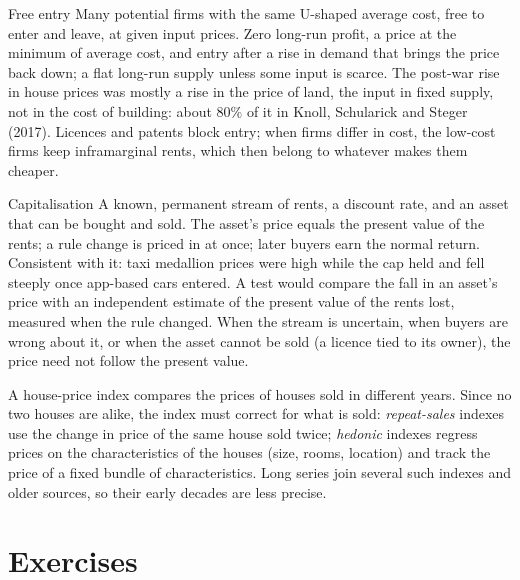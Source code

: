\begin{model}{Free entry}
\assumes Many potential firms with the same U-shaped average cost, free to
enter and leave, at given input prices.
\predicts Zero long-run profit, a price at the minimum of average cost, and
entry after a rise in demand that brings the price back down; a flat
long-run supply unless some input is scarce.
\tested The post-war rise in house prices was mostly a rise in the price of
land, the input in fixed supply, not in the cost of building: about $80\%$
of it in Knoll, Schularick and Steger (2017). %
\breaks Licences and patents block entry; when firms differ in cost, the
low-cost firms keep inframarginal rents, which then belong to whatever
makes them cheaper.
\end{model}

\begin{model}{Capitalisation}
\assumes A known, permanent stream of rents, a discount rate, and an asset
that can be bought and sold.
\predicts The asset's price equals the present value of the rents; a rule
change is priced in at once; later buyers earn the normal return.
\tested Consistent with it: taxi medallion prices were high while the cap
held and fell steeply once app-based cars entered. %
A test would compare the fall in an asset's price with an independent
estimate of the present value of the rents lost, measured when the rule
changed.
\breaks When the stream is uncertain, when buyers are wrong about it, or
when the asset cannot be sold (a licence tied to its owner), the price need
not follow the present value.
\end{model}

\begin{measure}
A house-price index compares the prices of houses sold in different
years. Since no two houses are alike, the index must correct for what is
sold: \emph{repeat-sales} indexes use the change in price of the same house
sold twice; \emph{hedonic} indexes regress prices on the characteristics of
the houses (size, rooms, location) and track the price of a fixed bundle of
characteristics. Long series join several such indexes and older sources,
so their early decades are less precise.
\end{measure}

\section*{Exercises}\label{sec:b1:competitive-industry:exercises}

